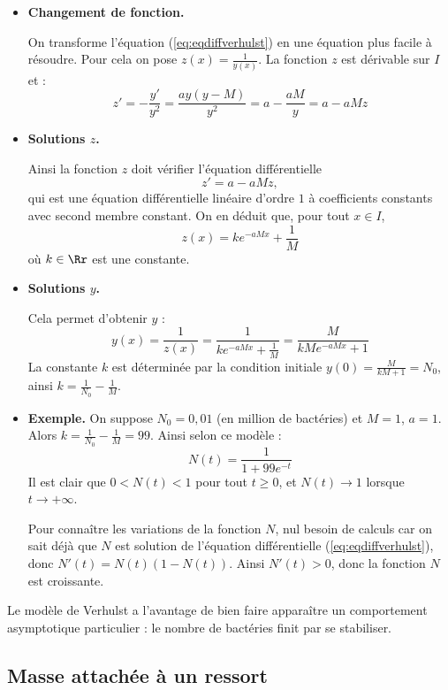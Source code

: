 \documentclass[class=report,crop=false]{standalone}
\begin{document}
\begin{itemize}


  \item \textbf{Changement de fonction.}

  On transforme l'équation (\ref{eq:eqdiffverhulst})
  en une équation plus facile à résoudre.
  Pour cela on pose $z(x) = \frac{1}{y(x)}$.
  La fonction $z$ est dérivable sur $I$ et :
  $$z'=-\frac{y'}{y^2} = \frac{ay(y-M)}{y^2} = a - \frac{aM}{y} = a-aMz$$


  \item \textbf{Solutions $z$.}

  Ainsi la fonction $z$ doit vérifier l'équation différentielle
  $$z' = a-aMz,$$
  qui est une équation différentielle linéaire d'ordre $1$
  à coefficients constants avec second membre constant.
  On en déduit que, pour tout $x \in I$,
  $$z(x) = k e^{-aMx} + \frac1M$$
  où $k \in \Rr$ est une constante.

  \item \textbf{Solutions $y$.}

  Cela permet d'obtenir $y$ :
  $$y(x) = \frac{1}{z(x)} = \frac{1}{k e^{-aMx} + \frac1M} = \frac{M}{kM e^{-aMx}+1}$$
  La constante $k$ est déterminée par la condition initiale
  $y(0) = \frac{M}{kM+1}=N_0$, ainsi $k = \frac{1}{N_0}-\frac{1}{M}$.

  \item \textbf{Exemple.}
  On suppose $N_0 = 0,01$ (en million de bactéries) et $M=1$, $a=1$.
  Alors $k = \frac{1}{N_0}-\frac{1}{M} = 99$.
  Ainsi selon ce modèle :
  $$N(t) = \frac{1}{1 + 99 e^{-t}}$$
  Il est clair que $0<N(t)<1$ pour tout $t\ge0$, et
  $N(t) \to 1$ lorsque $t\to+\infty$.

  Pour connaître les variations de la fonction $N$, nul besoin de calculs car on sait déjà que
  $N$ est solution de l'équation différentielle (\ref{eq:eqdiffverhulst}), donc
  $N'(t) = N(t)(1 - N(t))$.
  Ainsi $N'(t)>0$, donc la fonction $N$ est croissante.
\end{itemize}



Le modèle de Verhulst a l'avantage de
bien faire apparaître un comportement asymptotique particulier :
le nombre de bactéries finit par se stabiliser.




\subsection{Masse attachée à un ressort}
\end{document}
